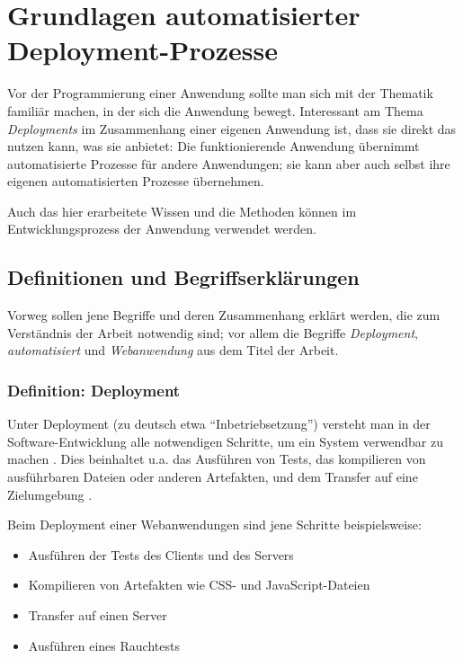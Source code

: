 \chapter{Grundlagen automatisierter Deployment-Prozesse}

Vor der Programmierung einer Anwendung sollte man sich mit der Thematik familiär machen, in der sich die Anwendung bewegt. Interessant am Thema \emph{Deployments} im Zusammenhang einer eigenen Anwendung ist, dass sie direkt das nutzen kann, was sie anbietet: Die funktionierende Anwendung übernimmt automatisierte Prozesse für andere Anwendungen; sie kann aber auch selbst ihre eigenen automatisierten Prozesse übernehmen.

Auch das hier erarbeitete Wissen und die Methoden können im Entwicklungsprozess der Anwendung verwendet werden.

\section{Definitionen und Begriffserklärungen}

Vorweg sollen jene Begriffe und deren Zusammenhang erklärt werden, die zum Verständnis der Arbeit notwendig sind; vor allem die Begriffe \emph{Deployment}, \emph{automatisiert} und \emph{Webanwendung} aus dem Titel der Arbeit.

\subsection{Definition: Deployment}

Unter Deployment (zu deutsch etwa ``Inbetriebsetzung'') versteht man in der Soft\-ware-Entwicklung alle notwendigen Schritte, um ein System verwendbar zu machen \citep[21]{Breuer2009}. Dies beinhaltet u.a. das Ausführen von Tests, das kompilieren von ausführbaren Dateien oder anderen Artefakten, und dem Transfer auf eine Zielumgebung \citep[4]{Humble2010}.

Beim Deployment einer Webanwendungen sind jene Schritte beispielsweise:

\begin{itemize}
  \item Ausführen der Tests des Clients und des Servers
  \item Kompilieren von Artefakten wie CSS- und JavaScript-Dateien
  \item Transfer auf einen Server
  \item Ausführen eines Rauchtests
\end{itemize}

